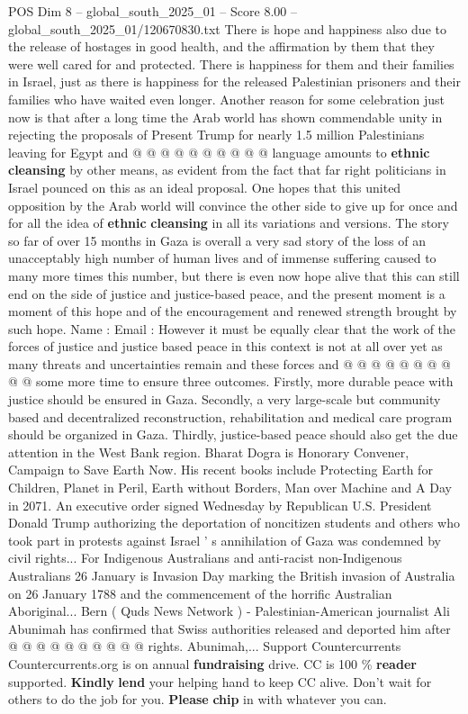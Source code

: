 \begin{textsample}{POS Dim 8 – global\_south\_2025\_01 – Score 8.00 – global\_south\_2025\_01/120670830.txt}
There is hope and happiness also due to the release of hostages in good health, and the affirmation by them that they were well cared for and protected.
There is happiness for them and their families in Israel, just as there is happiness for the released Palestinian prisoners and their families who have waited even longer.
Another reason for some celebration just now is that after a long time the Arab world has shown commendable unity in rejecting the proposals of Present Trump for nearly 1.5 million Palestinians leaving for Egypt and @ @ @ @ @ @ @ @ @ @ language amounts to \textbf{ethnic} \textbf{cleansing} by other means, as evident from the fact that far right politicians in Israel pounced on this as an ideal proposal.
One hopes that this united opposition by the Arab world will convince the other side to give up for once and for all the idea of \textbf{ethnic} \textbf{cleansing} in all its variations and versions.
The story so far of over 15 months in Gaza is overall a very sad story of the loss of an unacceptably high number of human lives and of immense suffering caused to many more times this number, but there is even now hope alive that this can still end on the side of justice and justice-based peace, and the present moment is a moment of this hope and of the encouragement and renewed strength brought by such hope.
Name : Email : However it must be equally clear that the work of the forces of justice and justice based peace in this context is not at all over yet as many threats and uncertainties remain and these forces and @ @ @ @ @ @ @ @ @ @ some more time to ensure three outcomes.
Firstly, more durable peace with justice should be ensured in Gaza.
Secondly, a very large-scale but community based and decentralized reconstruction, rehabilitation and medical care program should be organized in Gaza.
Thirdly, justice-based peace should also get the due attention in the West Bank region.
Bharat Dogra is Honorary Convener, Campaign to Save Earth Now.
His recent books include Protecting Earth for Children, Planet in Peril, Earth without Borders, Man over Machine and A Day in 2071.
An executive order signed Wednesday by Republican U.S.
President Donald Trump authorizing the deportation of noncitizen students and others who took part in protests against Israel ' s annihilation of Gaza was condemned by civil rights...
For Indigenous Australians and anti-racist non-Indigenous Australians 26 January is Invasion Day marking the British invasion of Australia on 26 January 1788 and the commencement of the horrific Australian Aboriginal...
Bern ( Quds News Network ) - Palestinian-American journalist Ali Abunimah has confirmed that Swiss authorities released and deported him after @ @ @ @ @ @ @ @ @ @ rights.
Abunimah,...
Support Countercurrents Countercurrents.org is on annual \textbf{fundraising} drive.
CC is 100 \% \textbf{reader} supported. \textbf{Kindly} \textbf{lend} your helping hand to keep CC alive.
Don't wait for others to do the job for you. \textbf{Please} \textbf{chip} in with whatever you can.

\end{textsample}
